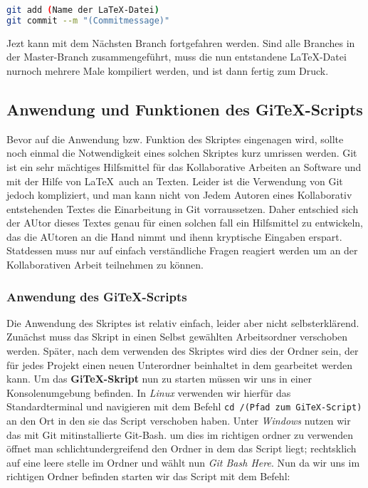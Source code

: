 \documentclass[12pt,a4paper]{scrartcl}
\begin{document}
\begin{description}
\begin{lstlisting}[language=bash]
git add (Name der LaTeX-Datei)
git commit --m "(Commitmessage)"
\end{lstlisting}

Jezt kann mit dem Nächsten Branch fortgefahren werden. Sind alle Branches in der Master-Branch zusammengeführt, muss die nun entstandene \LaTeX -Datei nurnoch mehrere Male kompiliert werden, und ist dann fertig zum Druck.
 
\end{description}

\subsection{Anwendung und Funktionen des GiTeX-Scripts}\label{Gitex}

Bevor auf die Anwendung bzw. Funktion des Skriptes eingenagen wird, sollte noch einmal die Notwendigkeit eines solchen Skriptes kurz umrissen werden. Git ist ein sehr mächtiges Hilfsmittel für das Kollaborative Arbeiten an Software und mit der Hilfe von \LaTeX \ auch an Texten. Leider ist die Verwendung von Git jedoch kompliziert, und man kann nicht von Jedem Autoren eines Kollaborativ entstehenden Textes die Einarbeitung in Git vorraussetzen. Daher entschied sich der AUtor dieses Textes genau für einen solchen fall ein Hilfsmittel zu entwickeln, das die AUtoren an die Hand nimmt und ihenn kryptische Eingaben erspart. Statdessen muss nur auf einfach verständliche Fragen reagiert werden um an der Kollaborativen Arbeit teilnehmen zu können.

\subsubsection{Anwendung des GiTeX-Scripts}

Die Anwendung des Skriptes ist relativ einfach, leider aber nicht selbsterklärend. Zunächst muss das Skript in einen Selbst gewählten Arbeitsordner verschoben werden. Später, nach dem verwenden des Skriptes wird dies der Ordner sein, der für jedes Projekt einen neuen Unterordner beinhaltet in dem gearbeitet werden kann.
Um das \textbf{GiTeX-Skript} nun zu starten müssen wir uns in einer Konsolenumgebung befinden. In \emph{Linux} verwenden wir hierfür das Standardterminal und navigieren mit dem Befehl \verb+cd /(Pfad zum GiTeX-Script)+ an den Ort in den sie das Script verschoben haben. Unter \emph{Windows} nutzen wir das mit Git mitinstallierte Git-Bash. um dies im richtigen ordner zu verwenden öffnet man schlichtundergreifend den Ordner in dem das Script liegt; rechtsklich auf eine leere stelle im Ordner und wählt nun \emph{Git Bash Here}. Nun da wir uns im richtigen Ordner befinden starten wir das Script mit dem Befehl:
\end{document}

